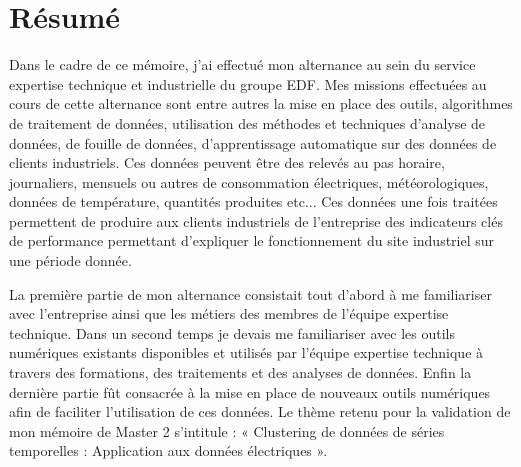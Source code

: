 \chapter*{Résumé}
 
Dans le cadre de ce mémoire, j’ai effectué mon alternance au sein du service expertise technique et industrielle du groupe EDF. Mes missions effectuées au cours de cette alternance sont entre autres la mise en place des outils, algorithmes de traitement de données, utilisation des méthodes et techniques d’analyse de données, de fouille de données, d’apprentissage automatique sur des données de clients industriels. Ces données peuvent être des relevés au pas horaire, journaliers, mensuels ou autres de consommation électriques, météorologiques, données de température, quantités produites etc... Ces données une fois traitées permettent de produire aux clients industriels de l’entreprise des indicateurs clés de performance permettant d’expliquer le fonctionnement du site industriel sur une période donnée.

La première partie de mon alternance consistait tout d’abord à me familiariser avec l’entreprise ainsi que les métiers des membres de l’équipe expertise technique. Dans un second temps je devais me familiariser avec les outils numériques existants disponibles et utilisés par l’équipe expertise technique à travers des formations, des traitements et des analyses de données. Enfin la dernière partie fût consacrée à la mise en place de nouveaux outils numériques afin de faciliter l’utilisation de ces données.
Le thème retenu pour la validation de mon mémoire de Master 2 s’intitule : « Clustering de données de séries temporelles : Application aux données électriques ».




